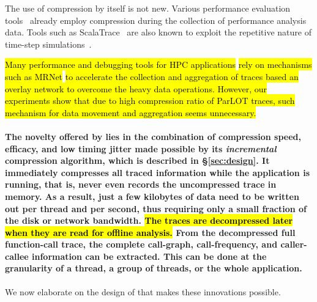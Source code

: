 The use of compression by itself is not new.
Various performance evaluation tools~\cite{tau,scorep,eventflowgraph} 
already employ compression during the collection
of performance analysis data.
%
Tools such as ScalaTrace~\cite{scalatrace}
are also known to exploit
the repetitive nature of time-step simulations~\cite{freitag}. %

\hl{
Many performance and debugging tools for HPC applications} \cite{stat,taumrnet}\hl{ rely on mechanisms such as MRNet}\cite{mrnet}\hl{ to accelerate the collection and aggregation of traces based an overlay network to overcome the heavy data operations. However, our experiments show that due to high compression ratio of ParLOT traces, such mechanism for data movement and aggregation seems unnecessary.}

\paragraph{The novelty offered by \parlot lies in the combination of compression
speed, efficacy, and low timing jitter
made possible by its {\em incremental}
compression algorithm, which is
described in \S\ref{sec:design}.
%
It immediately compresses all traced information while the application is running, that is, \parlot never even records the uncompressed trace in memory. 
%
As a result, just a few kilobytes of data need to be written out per thread and per second, thus requiring only a small fraction of the  disk or network bandwidth. 
%
\hl{The traces are decompressed later when they are read for offline analysis.} 
%
From the decompressed full function-call trace, the complete call-graph, 
call-frequency, and caller-callee information can be extracted. 
%
This can be done at the granularity of a thread, a group of threads, or the whole application.
}
%
We now elaborate on the design of \parlot that makes
these innovations possible.







